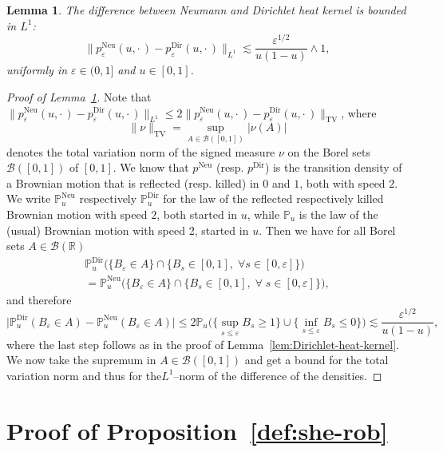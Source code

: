 \documentclass[10pt]{amsart}
\newtheorem{lemm}[theo]{Lemma}\newtheorem{prop}[theo]{Proposition}\newtheorem{coro}[theo]{Corollary}\newtheorem{conj}[theo]{Conjecture}
\theoremstyle{definition}\newtheorem{defi}[theo]{Definition}\newtheorem{rema}[theo]{Remark}\newtheorem{exam}[theo]{Example}\newtheorem{exem}[theo]{Example}\newtheorem{nota}[theo]{Notation}
\DeclareMathOperator{\Dir}{Dir}
\DeclareMathOperator{\Neu}{Neu}
\DeclareMathOperator{\TV}{TV}
\newcommand{\mc}[1]{{\mathcal #1}}
\renewcommand{\mc}[1]{{\mathcal #1}}
\renewcommand{\leq}{\leqslant}
\renewcommand{\geq}{\geqslant}
\let\oldforall\forall
\renewcommand*{\forall}{\mathrel{\oldforall}}
\begin{document}
\begin{lemm}\label{lem:Neumann--Dirichlet}
The difference between Neumann and Dirichlet heat kernel is bounded in $L^1$:
\[
\big\| p^{\Neu}_{\varepsilon} (u, \cdot\,) - p^{\Dir}_{\varepsilon} (u, \cdot\,)
\big\|_{L^1} \lesssim \frac{\varepsilon^{1 / 2}}{u (1 - u)} \wedge 1,
\]
uniformly in $\varepsilon \in (0,1]$ and $u \in [0,1]$.
\end{lemm}

\begin{proof}[Proof of Lemma~\ref{lem:Neumann--Dirichlet}]
Note that $\| p^{\Neu}_{\varepsilon} (u, \cdot\,) - p_{\varepsilon}^{\Dir} (u,
\cdot\,) \|_{L^1} \leq 2 \| p^{\Neu}_{\varepsilon} (u,
\cdot\,) - p_{\varepsilon}^{\Dir} (u, \cdot\,) \|_{\TV}$, where
\[
\| \nu \|_{\TV} = \sup_{A \in \mc B([0,1])} |\nu(A)|
\]
denotes the total variation norm of the signed measure $\nu$ on the Borel sets $\mc B([0,1])$ of $[0,1]$. We know that $p^{\Neu}$ (resp. $p^{\Dir}$) is the transition density of a Brownian motion that is reflected (resp. killed) in $0$ and $1$, both with speed $2$. We write $\mathbb{P}^{\Neu}_u$ respectively $\mathbb{P}^{\Dir}_u$ for the law of the reflected respectively killed Brownian motion with speed $2$, both started in $u$, while $\mathbb{P}_u$ is the law of the (usual) Brownian motion with speed 2, started in $u$. Then we have for all Borel sets $A \in \mathcal{B} (\mathbb{R})$
\begin{multline*}
\mathbb{P}^{\Dir}_u \big(\big\{ B_{\varepsilon} \in A \big\} \cap \big\{ B_s \in [0, 1],\; \forall s
\in [0, \varepsilon] \big\}\big)\\=\mathbb{P}^{\Neu}_u \big(\big\{ B_{\varepsilon} \in A \big\}
\cap \big\{ B_s \in [0, 1], \; \forall \; s \in [0, \varepsilon] \big\}\big),
\end{multline*}
and therefore
\[
\big| \mathbb{P}^{\Dir}_u (B_{\varepsilon} \in A) -\mathbb{P}^{\Neu}_u (B_{\varepsilon} \in A) \big| \leq 2\mathbb{P}_u \big(\big\{ \sup_{s \leq
\varepsilon} B_s \geq 1 \big\} \cup \big\{ \inf_{s \leq \varepsilon} B_s
\leq 0 \big\}\big) \lesssim \frac{\varepsilon^{1 / 2}}{u (1 - u)},
\]
where the last step follows as in the proof of Lemma~\ref{lem:Dirichlet-heat-kernel}. We now take the supremum in $A\in \mc B([0,1])$ and get a bound for the total variation norm and thus for the\linebreak $L^1$--norm of the difference of the densities.
\end{proof}

\section{Proof of Proposition~\ref{def:she-rob}}\label{app:she-proof}
\end{document}
